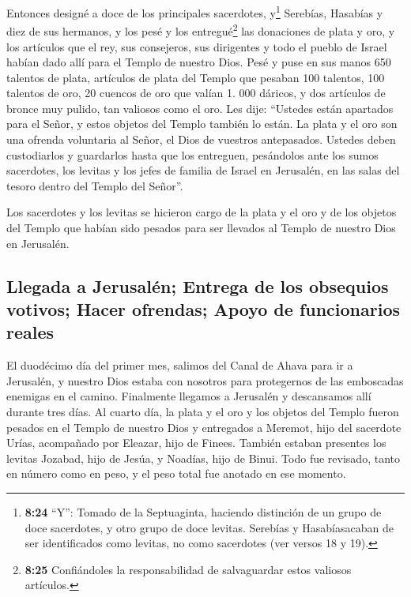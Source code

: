  Entonces designé a doce de los principales sacerdotes,
y\footnote{\textbf{8:24} ``Y'': Tomado de la Septuaginta, haciendo
  distinción de un grupo de doce sacerdotes, y otro grupo de doce
  levitas. Serebías y Hasabíasacaban de ser identificados como levitas,
  no como sacerdotes (ver versos 18 y 19).} Serebías, Hasabías y diez de
sus hermanos,  y los pesé y los entregué\footnote{\textbf{8:25}
  Confiándoles la responsabilidad de salvaguardar estos valiosos
  artículos.} las donaciones de plata y oro, y los artículos que el rey,
sus consejeros, sus dirigentes y todo el pueblo de Israel habían dado
allí para el Templo de nuestro Dios.  Pesé y puse en sus
manos 650 talentos de plata, artículos de plata del Templo que pesaban
100 talentos, 100 talentos de oro,  20 cuencos de oro que
valían 1. 000 dáricos, y dos artículos de bronce muy pulido, tan
valiosos como el oro.  Les dije: ``Ustedes están
apartados para el Señor, y estos objetos del Templo también lo están. La
plata y el oro son una ofrenda voluntaria al Señor, el Dios de vuestros
antepasados.  Ustedes deben custodiarlos y guardarlos
hasta que los entreguen, pesándolos ante los sumos sacerdotes, los
levitas y los jefes de familia de Israel en Jerusalén, en las salas del
tesoro dentro del Templo del Señor''.

 Los sacerdotes y los levitas se hicieron cargo de la
plata y el oro y de los objetos del Templo que habían sido pesados para
ser llevados al Templo de nuestro Dios en Jerusalén.

\hypertarget{llegada-a-jerusaluxe9n-entrega-de-los-obsequios-votivos-hacer-ofrendas-apoyo-de-funcionarios-reales}{%
\subsection{Llegada a Jerusalén; Entrega de los obsequios votivos; Hacer
ofrendas; Apoyo de funcionarios
reales}\label{llegada-a-jerusaluxe9n-entrega-de-los-obsequios-votivos-hacer-ofrendas-apoyo-de-funcionarios-reales}}

 El duodécimo día del primer mes, salimos del Canal de
Ahava para ir a Jerusalén, y nuestro Dios estaba con nosotros para
protegernos de las emboscadas enemigas en el camino. 
Finalmente llegamos a Jerusalén y descansamos allí durante tres días.
 Al cuarto día, la plata y el oro y los objetos del
Templo fueron pesados en el Templo de nuestro Dios y entregados a
Meremot, hijo del sacerdote Urías, acompañado por Eleazar, hijo de
Finees. También estaban presentes los levitas Jozabad, hijo de Jesúa, y
Noadías, hijo de Binui.  Todo fue revisado, tanto en
número como en peso, y el peso total fue anotado en ese momento.

